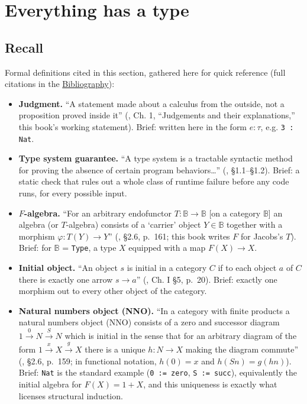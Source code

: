 \section{Everything has a type}\label{sec:01-basics:01-everything-has-a-type:1}

\subsection{Recall}\label{sec:01-basics:01-everything-has-a-type:2}

Formal definitions cited in this section, gathered here for quick reference (full citations in the \hyperref[sec:root:bibliography:1]{Bibliography}):

\begin{itemize}
\tightlist
\item
  \textbf{Judgment.} ``A statement made about a calculus from the outside, not a proposition proved inside it'' (\cite{MartinLof1984}, Ch. 1, ``Judgements and their explanations,'' this book's working statement). Brief: written here in the form \(e : \tau\), e.g. \texttt{3 : Nat}.
\item
  \textbf{Type system guarantee.} ``A type system is a tractable syntactic method for proving the absence of certain program behaviors\ldots{}'' (\cite{Pierce2002}, §1.1--§1.2). Brief: a static check that rules out a whole class of runtime failure before any code runs, for every possible input.
\item
  \textbf{\(F\)-algebra.} ``For an arbitrary endofunctor \(T : \mathbb{B} \to
  \mathbb{B}\) {[}on a category \(\mathbb{B}\){]} an algebra (or \(T\)-algebra) consists of a `carrier' object \(Y \in \mathbb{B}\) together with a morphism \(\varphi : T(Y) \to Y\)'' (\cite{Jacobs1999}, §2.6, p.~161; this book writes \(F\) for Jacobs's \(T\)). Brief: for \(\mathbb{B}\) = \texttt{Type}, a type \(X\) equipped with a map \(F(X) \to X\).
\item
  \textbf{Initial object.} ``An object \(s\) is initial in a category \(C\) if to each object \(a\) of \(C\) there is exactly one arrow \(s \to a\)'' (\cite{MacLane1998}, Ch. I §5, p.~20). Brief: exactly one morphism out to every other object of the category.
\item
  \textbf{Natural numbers object (NNO).} ``In a category with finite products a natural numbers object (NNO) consists of a zero and successor diagram \(1 \xrightarrow{0} N \xrightarrow{S} N\) which is initial in the sense that for an arbitrary diagram of the form \(1 \xrightarrow{x} X \xrightarrow{g} X\) there is a unique \(h : N \to X\) making the diagram commute'' (\cite{Jacobs1999}, §2.6, p.~159; in functional notation, \(h(0) = x\) and \(h(Sn) = g(hn)\)). Brief: \texttt{Nat} is the standard example (\texttt{0 := zero}, \texttt{S := succ}), equivalently the initial algebra for \(F(X) = 1 + X\), and this uniqueness is exactly what licenses structural induction.
\end{itemize}

